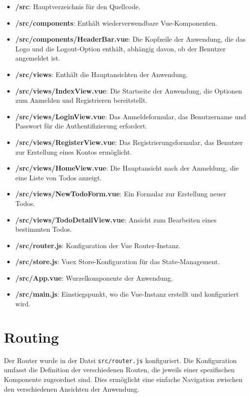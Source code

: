 \begin{itemize}
	\item \textbf{/src}: Hauptverzeichnis für den Quellcode.
	\item \textbf{/src/components}: Enthält wiederverwendbare Vue-Komponenten.
	\item \textbf{/src/components/HeaderBar.vue}: Die Kopfzeile der Anwendung, die das Logo und die Logout-Option enthält, abhängig davon, ob der Benutzer angemeldet ist.
	\item \textbf{/src/views}: Enthält die Hauptansichten der Anwendung.
	\item \textbf{/src/views/IndexView.vue}: Die Startseite der Anwendung, die Optionen zum Anmelden und Registrieren bereitstellt.
	\item \textbf{/src/views/LoginView.vue}: Das Anmeldeformular, das Benutzername und Passwort für die Authentifizierung erfordert.
	\item \textbf{/src/views/RegisterView.vue}: Das Registrierungsformular, das Benutzer zur Erstellung eines Kontos ermöglicht.%
	\item \textbf{/src/views/HomeView.vue}: Die Hauptansicht nach der Anmeldung, die eine Liste von Todos anzeigt.
	\item \textbf{/src/views/NewTodoForm.vue}: Ein Formular zur Erstellung neuer Todos.
	\item \textbf{/src/views/TodoDetailView.vue}: Ansicht zum Bearbeiten eines bestimmten Todos.
	\item \textbf{/src/router.js}: Konfiguration der Vue Router-Instanz.
	\item \textbf{/src/store.js}: Vuex Store-Konfiguration für das State-Management.
	\item \textbf{/src/App.vue}: Wurzelkomponente der Anwendung.
	\item \textbf{/src/main.js}: Einstiegspunkt, wo die Vue-Instanz erstellt und konfiguriert wird.

\end{itemize}

\section{Routing}
Der Router wurde in der Datei \texttt{src/router.js} konfiguriert. Die Konfiguration umfasst die Definition der verschiedenen Routen, die jeweils einer spezifischen Komponente zugeordnet sind. Dies ermöglicht eine einfache Navigation zwischen den verschiedenen Ansichten der Anwendung.
	
